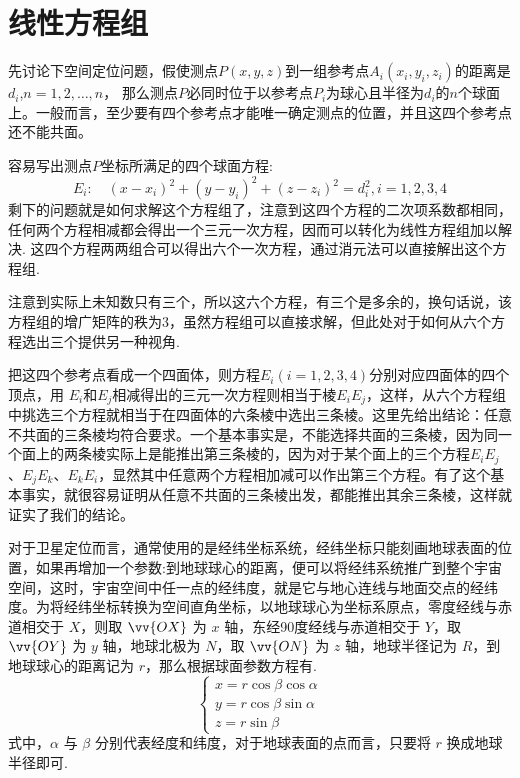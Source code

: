 
\section{线性方程组}
\label{sec:linear-equations-system}

\begin{example}[卫星定位原理]
  先讨论下空间定位问题，假使测点$P(x,y,z)$到一组参考点$A_i(x_i,y_i,z_i)$的距离是$d_i$,$n=1,2,\ldots,n$， 那么测点$P$必同时位于以参考点$P_i$为球心且半径为$d_i$的$n$个球面上。一般而言，至少要有四个参考点才能唯一确定测点的位置，并且这四个参考点还不能共面。

  容易写出测点$P$坐标所满足的四个球面方程:
  \[ E_i: \quad (x-x_i)^2+(y-y_i)^2+(z-z_i)^2=d_i^2, i = 1,2,3,4 \]
  剩下的问题就是如何求解这个方程组了，注意到这四个方程的二次项系数都相同，任何两个方程相减都会得出一个三元一次方程，因而可以转化为线性方程组加以解决. 这四个方程两两组合可以得出六个一次方程，通过消元法可以直接解出这个方程组.
  
  注意到实际上未知数只有三个，所以这六个方程，有三个是多余的，换句话说，该方程组的增广矩阵的秩为3，虽然方程组可以直接求解，但此处对于如何从六个方程选出三个提供另一种视角.

 把这四个参考点看成一个四面体，则方程$E_i(i=1,2,3,4)$分别对应四面体的四个顶点，用 $E_i$和$E_j$相减得出的三元一次方程则相当于棱$E_iE_j$，这样，从六个方程组中挑选三个方程就相当于在四面体的六条棱中选出三条棱。这里先给出结论：任意不共面的三条棱均符合要求。一个基本事实是，不能选择共面的三条棱，因为同一个面上的两条棱实际上是能推出第三条棱的，因为对于某个面上的三个方程$E_iE_j$、$E_jE_k$、$E_kE_i$，显然其中任意两个方程相加减可以作出第三个方程。有了这个基本事实，就很容易证明从任意不共面的三条棱出发，都能推出其余三条棱，这样就证实了我们的结论。

 对于卫星定位而言，通常使用的是经纬坐标系统，经纬坐标只能刻画地球表面的位置，如果再增加一个参数:到地球球心的距离，便可以将经纬系统推广到整个宇宙空间，这时，宇宙空间中任一点的经纬度，就是它与地心连线与地面交点的经纬度。为将经纬坐标转换为空间直角坐标，以地球球心为坐标系原点，零度经线与赤道相交于 $X$，则取 $\vv{OX}$ 为 $x$ 轴，东经90度经线与赤道相交于 $Y$，取 $\vv{OY}$ 为 $y$ 轴，地球北极为 $N$，取 $\vv{ON}$ 为 $z$ 轴，地球半径记为 $R$，到地球球心的距离记为 $r$，那么根据球面参数方程有.
 \[
   \begin{cases}
     x = r \cos{\beta}\cos{\alpha} \\
     y = r \cos{\beta}\sin{\alpha} \\
     z = r \sin{\beta}
   \end{cases}
 \]
 式中，$\alpha$ 与 $\beta$ 分别代表经度和纬度，对于地球表面的点而言，只要将 $r$ 换成地球半径即可. 


\end{example}
